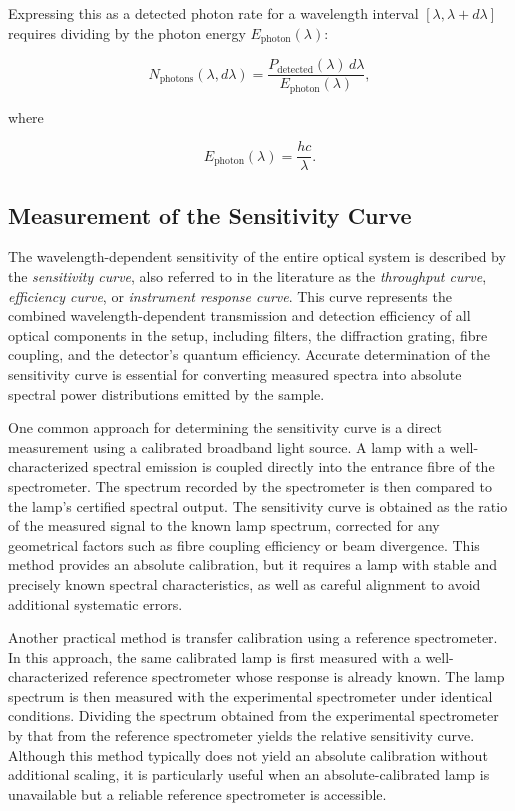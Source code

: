 \documentclass[
	parskip=half,
	a4paper,
]{scrarticle}
\begin{document}
Expressing this as a detected photon rate for a wavelength interval $[\lambda, \lambda + d\lambda]$ requires dividing by the photon energy $E_\text{photon}(\lambda)$:

\begin{equation}
    N_\text{photons}(\lambda, d\lambda)
    = \frac{P_\text{detected}(\lambda)\, d\lambda}{E_\text{photon}(\lambda)},
\end{equation}

where

\begin{equation}
    E_\text{photon}(\lambda)
    = \frac{h c}{\lambda}.
\end{equation}

\subsection{Measurement of the Sensitivity Curve}

The wavelength-dependent sensitivity of the entire optical system is described by the \emph{sensitivity curve}, also referred to in the literature as the \emph{throughput curve}, \emph{efficiency curve}, or \emph{instrument response curve}. This curve represents the combined wavelength-dependent transmission and detection efficiency of all optical components in the setup, including filters, the diffraction grating, fibre coupling, and the detector's quantum efficiency. Accurate determination of the sensitivity curve is essential for converting measured spectra into absolute spectral power distributions emitted by the sample.

One common approach for determining the sensitivity curve is a direct measurement using a calibrated broadband light source. A lamp with a well-characterized spectral emission is coupled directly into the entrance fibre of the spectrometer. The spectrum recorded by the spectrometer is then compared to the lamp's certified spectral output. The sensitivity curve is obtained as the ratio of the measured signal to the known lamp spectrum, corrected for any geometrical factors such as fibre coupling efficiency or beam divergence. This method provides an absolute calibration, but it requires a lamp with stable and precisely known spectral characteristics, as well as careful alignment to avoid additional systematic errors.

Another practical method is transfer calibration using a reference spectrometer. In this approach, the same calibrated lamp is first measured with a well-characterized reference spectrometer whose response is already known. The lamp spectrum is then measured with the experimental spectrometer under identical conditions. Dividing the spectrum obtained from the experimental spectrometer by that from the reference spectrometer yields the relative sensitivity curve. Although this method typically does not yield an absolute calibration without additional scaling, it is particularly useful when an absolute-calibrated lamp is unavailable but a reliable reference spectrometer is accessible.
\end{document}
